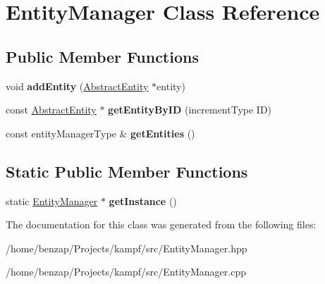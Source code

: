 \hypertarget{classEntityManager}{\section{Entity\-Manager Class Reference}
\label{classEntityManager}
}
\subsection*{Public Member Functions}
\begin{DoxyCompactItemize}
\item 
\hypertarget{classEntityManager_a4501d88eb9497cd3e4c9d1abc08be061}{void {\bfseries add\-Entity} (\hyperlink{classAbstractEntity}{Abstract\-Entity} $\ast$entity)}\label{classEntityManager_a4501d88eb9497cd3e4c9d1abc08be061}

\item 
\hypertarget{classEntityManager_ac3594e7cef3678c00fc5b4b8ed8f22c3}{const \hyperlink{classAbstractEntity}{Abstract\-Entity} $\ast$ {\bfseries get\-Entity\-By\-I\-D} (increment\-Type I\-D)}\label{classEntityManager_ac3594e7cef3678c00fc5b4b8ed8f22c3}

\item 
\hypertarget{classEntityManager_a527ef6b7d3580193509f219a5a8b9b79}{const entity\-Manager\-Type \& {\bfseries get\-Entities} ()}\label{classEntityManager_a527ef6b7d3580193509f219a5a8b9b79}

\end{DoxyCompactItemize}
\subsection*{Static Public Member Functions}
\begin{DoxyCompactItemize}
\item 
\hypertarget{classEntityManager_a65ec69ca7631238bfb45c65de80a26b1}{static \hyperlink{classEntityManager}{Entity\-Manager} $\ast$ {\bfseries get\-Instance} ()}\label{classEntityManager_a65ec69ca7631238bfb45c65de80a26b1}

\end{DoxyCompactItemize}


The documentation for this class was generated from the following files\-:\begin{DoxyCompactItemize}
\item 
/home/benzap/\-Projects/kampf/src/Entity\-Manager.\-hpp\item 
/home/benzap/\-Projects/kampf/src/Entity\-Manager.\-cpp\end{DoxyCompactItemize}
